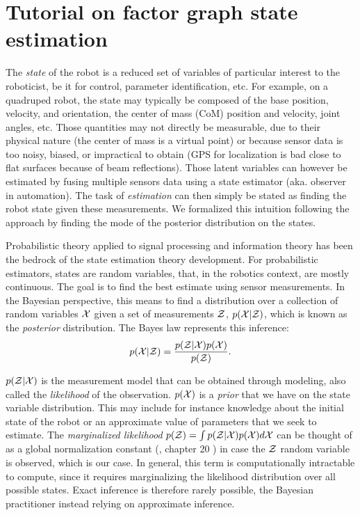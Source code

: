 \chapter{Tutorial on factor graph state estimation}
\minitoc
\bigskip

The \textit{state} of the robot is a reduced set of variables of particular interest to the roboticist, be it for control, parameter identification, etc.
For example, on a quadruped robot, the state may typically be composed of the base position, velocity, and orientation, the center of mass (CoM) position 
and velocity, joint angles, etc.  
Those quantities may not directly be measurable, due to their physical nature (the center of mass is a virtual point) or because sensor data
is too noisy, biased, or impractical to obtain (\eg GPS for localization is bad close to flat surfaces because of beam reflections). 
Those latent variables can however be estimated by fusing multiple sensors data using a state estimator (aka. observer in automation). 
The task of \textit{estimation} can then simply be stated as finding the robot state given these measurements. We formalized this intuition
following the approach by finding the mode of the posterior distribution on the states. 

Probabilistic theory applied to signal processing and information theory has been the bedrock of the state estimation theory development.
For probabilistic estimators, states are random variables, that, in the robotics context, are mostly continuous.
The goal is to find the best estimate using sensor measurements.
In the Bayesian perspective, this means to find a distribution over a collection of random variables $\mathcal{X}$ given a set 
of measurements $\mathcal{Z}$, $p(\mathcal{X} | \mathcal{Z})$, which is known as the \textit{posterior} distribution. 
The Bayes law represents this inference:
%
\begin{equation}
    p(\mathcal{X} | \mathcal{Z}) = \frac{p(\mathcal{Z} | \mathcal{X}) p(\mathcal{X})}{p(\mathcal{Z})}.
\end{equation}

$p(\mathcal{Z} | \mathcal{X})$ is the measurement model that can be obtained through modeling, also called the \textit{likelihood} of the observation. 
$p(\mathcal{X})$ is a \textit{prior} that we have on the state variable distribution. This may include for instance knowledge about the initial state of the robot or
an approximate value of parameters that we seek to estimate.
The \textit{marginalized likelihood} $p(\mathcal{Z}) = \int p(\mathcal{Z}|\mathcal{X})p(\mathcal{X})d\mathcal{X} $ can be thought of as a global normalization constant (\cite{koller2009probabilistic}, chapter 20 ) in case 
the $\mathcal{Z}$ random variable is observed, which is our case. In general, this term is computationally intractable to compute, since it requires marginalizing
the likelihood distribution over all possible states. Exact inference is therefore rarely possible, the Bayesian practitioner instead relying on approximate inference.

